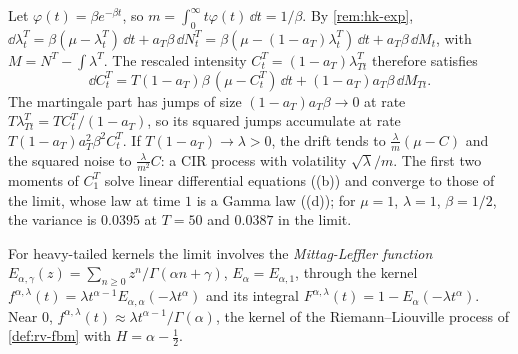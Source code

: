 \begin{remark}\label{rem:hk-cir}
Let $\varphi(t)=\beta e^{-\beta t}$, so $m=\int_0^\infty t\varphi(t)\,\dd t=1/\beta$. By \cref{rem:hk-exp},
$\dd\lambda^T_t=\beta(\mu-\lambda^T_t)\,\dd t+a_T\beta\,\dd N^T_t=\beta(\mu-(1-a_T)\lambda^T_t)\,\dd t+a_T\beta\,\dd M_t$, with
$M=N^T-\int\lambda^T$. The rescaled intensity $C^T_t=(1-a_T)\lambda^T_{Tt}$ therefore satisfies
\[
  \dd C^T_t=T(1-a_T)\beta\,(\mu-C^T_t)\,\dd t+(1-a_T)a_T\beta\,\dd M_{Tt} .
\]
The martingale part has jumps of size $(1-a_T)a_T\beta\to0$ at rate $T\lambda^T_{Tt}=TC^T_t/(1-a_T)$, so its
squared jumps accumulate at rate $T(1-a_T)a_T^2\beta^2C^T_t$. If $T(1-a_T)\to\lambda>0$, the drift tends to
$\frac\lambda m(\mu-C)$ and the squared noise to $\frac\lambda{m^2}C$: a CIR process with volatility $\sqrt\lambda/m$.
The first two moments of $C^T_1$ solve linear differential equations ((b)) and converge to those
of the limit, whose law at time $1$ is a Gamma law ((d)); for $\mu=1$, $\lambda=1$, $\beta=1/2$, the variance is $0.0395$ at $T=50$ and $0.0387$ in the
limit.
\end{remark}

For heavy-tailed kernels the limit involves the \emph{Mittag-Leffler function}
$E_{\alpha,\gamma}(z)=\sum_{n\ge0}z^n/\Gamma(\alpha n+\gamma)$, $E_\alpha=E_{\alpha,1}$, through the kernel
$f^{\alpha,\lambda}(t)=\lambda t^{\alpha-1}E_{\alpha,\alpha}(-\lambda t^\alpha)$ and its integral
$F^{\alpha,\lambda}(t)=1-E_\alpha(-\lambda t^\alpha)$. Near $0$, $f^{\alpha,\lambda}(t)\approx\lambda t^{\alpha-1}/\Gamma(\alpha)$,
the kernel of the Riemann--Liouville process of \cref{def:rv-fbm} with $H=\alpha-\frac12$.

